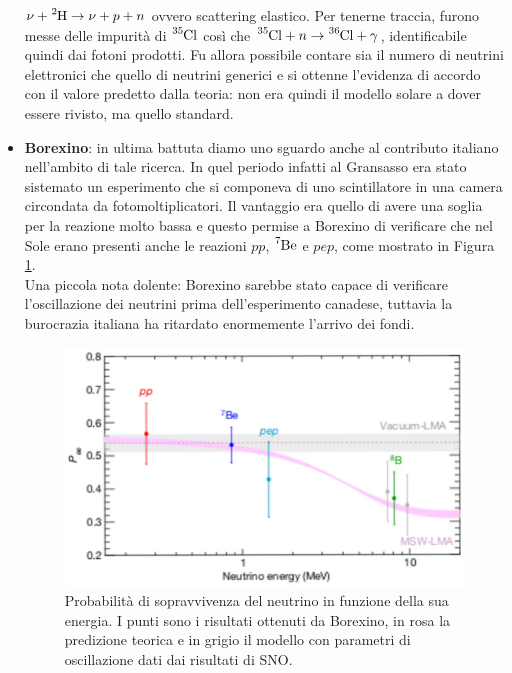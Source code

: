 \begin{itemize}
    $\nu + \ce{^2H} \to \nu + p +n$ ovvero scattering elastico. Per tenerne traccia, furono messe delle impurità di $\ce{^{35}Cl}$ così che $\ce{^{35}Cl}+n\to \ce{^{36}Cl +\gamma}$, identificabile quindi dai fotoni prodotti. Fu allora possibile contare sia il numero di neutrini elettronici che quello di neutrini generici e si ottenne l'evidenza di accordo con il valore predetto dalla teoria: non era quindi il modello solare a dover essere rivisto, ma quello standard.
    \item \textbf{Borexino}: in ultima battuta diamo uno sguardo anche al contributo italiano nell'ambito di tale ricerca. In quel periodo infatti al Gransasso era stato sistemato un esperimento che si componeva di uno scintillatore in una camera circondata da fotomoltiplicatori. Il vantaggio era quello di avere una soglia per la reazione molto bassa e questo permise a Borexino di verificare che nel Sole erano presenti anche le reazioni $pp$, $\ce{^7Be}$ e $pep$, come mostrato in Figura \ref{0322_risultati}.\\
    \noindent Una piccola nota dolente: Borexino sarebbe stato capace di verificare l'oscillazione dei neutrini prima dell'esperimento canadese, tuttavia la burocrazia italiana ha ritardato enormemente l'arrivo dei fondi.
    \begin{figure}[ph]
        \centering
        \includegraphics[scale=0.2]{Immagini/0322_energianu.png}
        \caption{Probabilità di sopravvivenza del neutrino in funzione della sua energia. I punti sono i risultati ottenuti da Borexino, in rosa la predizione teorica e in grigio il modello con parametri di oscillazione dati dai risultati di SNO.}
        \label{0322_risultati}
    \end{figure}
    \begin{figure}[p!h]

\end{figure}
\end{itemize}
